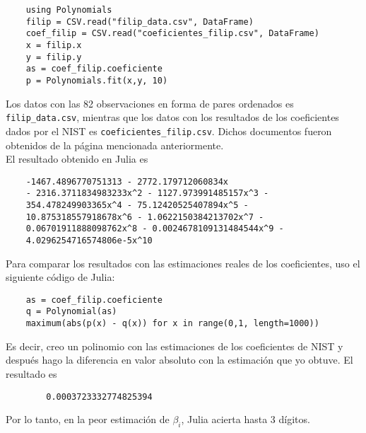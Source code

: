 \begin{verbatim}
    using Polynomials
    filip = CSV.read("filip_data.csv", DataFrame)
    coef_filip = CSV.read("coeficientes_filip.csv", DataFrame)
    x = filip.x
    y = filip.y
    as = coef_filip.coeficiente
    p = Polynomials.fit(x,y, 10)
\end{verbatim}

Los datos con las 82 observaciones en forma de pares ordenados es \texttt{filip\_data.csv}, mientras que los datos con los resultados de los coeficientes dados por el NIST es \texttt{coeficientes\_filip.csv}. Dichos documentos fueron obtenidos de la página mencionada anteriormente. 
\\
El resultado obtenido en Julia es 

\begin{tcolorbox}
    \begin{verbatim}
    -1467.4896770751313 - 2772.179712060834x
    - 2316.3711834983233x^2 - 1127.973991485157x^3 -
    354.478249903365x^4 - 75.12420525407894x^5 -
    10.875318557918678x^6 - 1.0622150384213702x^7 -
    0.06701911888098762x^8 - 0.0024678109131484544x^9 -
    4.0296254716574806e-5x^10
    \end{verbatim}
\end{tcolorbox}


Para comparar los resultados con las estimaciones reales de los coeficientes, uso el siguiente código de Julia:

\begin{verbatim}
    as = coef_filip.coeficiente
    q = Polynomial(as)
    maximum(abs(p(x) - q(x)) for x in range(0,1, length=1000))
\end{verbatim}

Es decir, creo un polinomio con las estimaciones de los coeficientes de NIST y después hago la diferencia en valor absoluto con la estimación que yo obtuve. El resultado es

\begin{tcolorbox}
    \begin{verbatim}
        0.0003723332774825394
    \end{verbatim}
\end{tcolorbox}

Por lo tanto, en la peor estimación de $\beta_i$, Julia acierta hasta 3 dígitos. 

